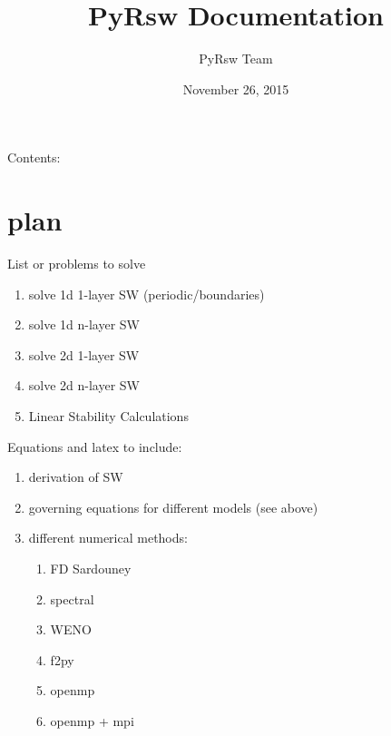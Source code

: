 \documentclass[letterpaper,10pt,english]{sphinxmanual}
\title{PyRsw Documentation}
\date{November 26, 2015}
\author{PyRsw Team}
\begin{document}
\maketitle
\tableofcontents
{}\label{index::doc}


Contents:


\chapter{plan}
\label{plan::doc}\label{plan:plan}\label{plan:welcome-to-pyrsw-s-documentation}
List or problems to solve
\begin{enumerate}
\item {} 
solve 1d 1-layer SW (periodic/boundaries)

\item {} 
solve 1d n-layer SW

\item {} 
solve 2d 1-layer SW

\item {} 
solve 2d n-layer SW

\item {} 
Linear Stability Calculations

\end{enumerate}

Equations and latex to include:
\begin{enumerate}
\item {} 
derivation of SW

\item {} 
governing equations for different models (see above)

\item {} 
different numerical methods:
\begin{enumerate}
\item {} 
FD Sardouney

\item {} 
spectral

\item {} 
WENO

\item {} 
f2py

\item {} 
openmp

\item {} 
openmp + mpi

\end{enumerate}

\end{enumerate}
\end{document}
